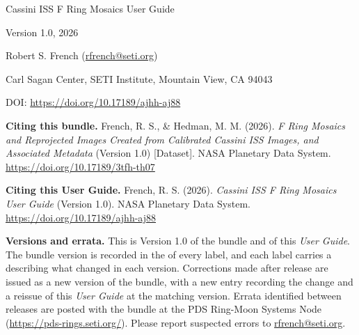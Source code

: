 \begin{center}
{\usgtitlefont Cassini ISS F Ring Mosaics User Guide\par}
\end{center}

\begin{center}
Version 1.0, 2026
\end{center}

\begin{center}
Robert S. French (\href{mailto:rfrench@seti.org}{rfrench@seti.org})
\end{center}

\begin{center}
Carl Sagan Center, SETI Institute, Mountain View, CA 94043
\end{center}

\begin{center}
DOI: \url{https://doi.org/10.17189/ajhh-aj88}
\end{center}

\vspace{2em}

\begin{center}
\begin{minipage}{0.88\linewidth}
\small

\noindent\textbf{Citing this bundle.} French, R. S., \& Hedman, M. M. (2026).
\textit{F Ring Mosaics and Reprojected Images Created from Calibrated Cassini ISS
Images, and Associated Metadata} (Version 1.0) [Dataset]. NASA Planetary Data System.
\url{https://doi.org/10.17189/3tfh-th07}

\vspace{0.75em}

\noindent\textbf{Citing this User Guide.} French, R. S. (2026).
\textit{Cassini ISS F Ring Mosaics User Guide} (Version 1.0). NASA Planetary Data
System. \url{https://doi.org/10.17189/ajhh-aj88}

\vspace{0.75em}

\noindent\textbf{Versions and errata.} This is Version 1.0 of the bundle and of this
\textit{User Guide}. The bundle version is recorded in the 
of every label, and each label carries a 
describing what changed in each version. Corrections made after release are issued as a
new version of the bundle, with a new  entry
recording the change and a reissue of this \textit{User Guide} at the matching version.
Errata identified between releases are posted with the bundle at the PDS Ring-Moon Systems
Node (\url{https://pds-rings.seti.org/}). Please report suspected errors to
\href{mailto:rfrench@seti.org}{rfrench@seti.org}.

\end{minipage}
\end{center}

